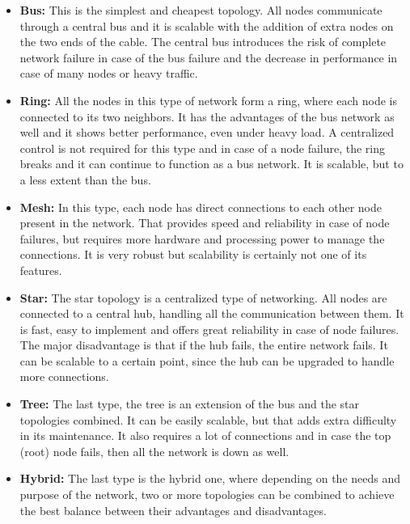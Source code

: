 \begin{itemize}
\item \textbf{Bus:} This is the simplest and cheapest topology.
All nodes communicate through a central bus and it is scalable with the addition of extra nodes on the two ends of the cable.
The central bus introduces the risk of complete network failure in case of the bus failure and the decrease in performance in case of many nodes or heavy traffic.
\item \textbf{Ring:} All the nodes in this type of network form a ring, where each node is connected to its two neighbors.
It has the advantages of the bus network as well and it shows better performance, even under heavy load.
A centralized control is not required for this type and in case of a node failure, the ring breaks and it can continue to function as a bus network.
It is scalable, but to a less extent than the bus.
\item \textbf{Mesh:} In this type, each node has direct connections to each other node present in the network.
That provides speed and reliability in case of node failures, but requires more hardware and processing power to manage the connections.
It is very robust but scalability is certainly not one of its features.
\item \textbf{Star:} The star topology is a centralized type of networking.
All nodes are connected to a central hub, handling all the communication between them.
It is fast, easy to implement and offers great reliability in case of node failures.
The major disadvantage is that if the hub fails, the entire network fails.
It can be scalable to a certain point, since the hub can be upgraded to handle more connections.
\item \textbf{Tree:} The last type, the tree is an extension of the bus and the star topologies combined.
It can be easily scalable, but that adds extra difficulty in its maintenance.
It also requires a lot of connections and in case the top (root) node fails, then all the network is down as well.
\item \textbf{Hybrid:} The last type is the hybrid one, where depending on the needs and purpose of the network, two or more topologies can be combined to achieve the best balance between their advantages and disadvantages.
\end{itemize}

